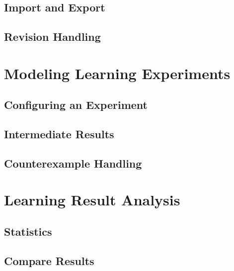 \section{Import and Export}
\section{Revision Handling}
\clearpage

\chapter{Modeling Learning Experiments}
\section{Configuring an Experiment}
\section{Intermediate Results}
\section{Counterexample Handling}
\clearpage

\chapter{Learning Result Analysis}
\section{Statistics}
\section{Compare Results}
\clearpage
 
